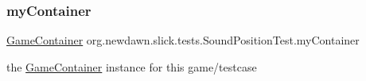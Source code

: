 \subsubsection{\texorpdfstring{my\+Container}{myContainer}}
{\footnotesize\ttfamily \mbox{\hyperlink{classorg_1_1newdawn_1_1slick_1_1_game_container}{Game\+Container}} org.\+newdawn.\+slick.\+tests.\+Sound\+Position\+Test.\+my\+Container\hspace{0.3cm}{\ttfamily [private]}}

the \mbox{\hyperlink{classorg_1_1newdawn_1_1slick_1_1_game_container}{Game\+Container}} instance for this game/testcase 
